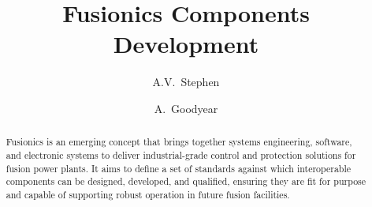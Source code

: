 \documentclass[preprint]{elsarticle}
\begin{document}
\begin{frontmatter}



\title{Fusionics Components Development}


	\author[UKAEA]{A.V.~Stephen} %
\author[UKAEA]{A.~Goodyear}


\begin{abstract}

Fusionics is an emerging concept that brings together systems engineering, software, and electronic systems to deliver industrial-grade control and protection solutions for fusion power plants. It aims to define a set of standards against which interoperable components can be designed, developed, and qualified, ensuring they are fit for purpose and capable of supporting robust operation in future fusion facilities.


\end{abstract}
\end{frontmatter}
\end{document}
